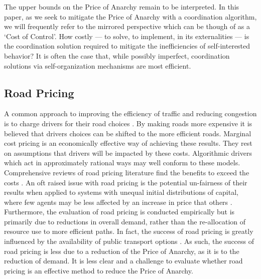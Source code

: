 The upper bounds on the Price of Anarchy remain to be interpreted. In this paper, as we seek to mitigate the Price of Anarchy with a coordination algorithm, we will frequently refer to the mirrored perspective which can be though of as a `Cost of Control'. How costly --- to solve, to implement, in its externalities --- is the coordination solution required to mitigate the inefficiencies of self-interested behavior? It is often the case that, while possibly imperfect, coordination solutions via self-organization mechanisms are most efficient.


\subsection{Road Pricing}

A common approach to improving the efficiency of traffic and reducing congestion is to charge drivers for their road choices \cite{morrison1986survey}. By making roads more expensive it is believed that drivers choices can be shifted to the more efficient roads. Marginal cost pricing is an economically effective way of achieving these results. They rest on assumptions that drivers will be impacted by these costs. Algorithmic drivers which act in approximately rational ways may well conform to these models. Comprehensive reviews of road pricing literature find the benefits to exceed the costs \cite{anas2011reducing}. An oft raised issue with road pricing is the potential un-fairness of their results when applied to systems with unequal initial distributions of capital, where few agents may be less affected by an increase in price that others \cite{levinson2010equity}. Furthermore, the evaluation of road pricing is conducted empirically but is primarily due to reductions in overall demand, rather than the re-allocation of resource use to more efficient paths. In fact, the success of road pricing is greatly influenced by the availability of public transport options \cite{anas2011reducing}. As such, the success of road pricing is less due to a reduction of the Price of Anarchy, as it is to the reduction of demand. It is less clear and a challenge to evaluate whether road pricing is an effective method to reduce the Price of Anarchy.



